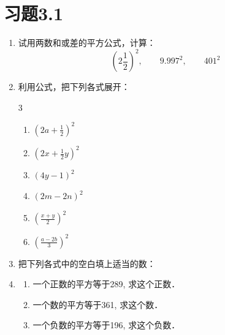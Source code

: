 \section*{习题3.1}
\begin{enumerate}
    \item 试用两数和或差的平方公式，计算：
\[\left(2\frac{1}{2}\right)^2,\qquad 9.997^2,\qquad 401^2\]
    \item 利用公式，把下列各式展开：
\begin{multicols}{3}
\begin{enumerate}
    \item $\left(2a+\frac{1}{2}\right)^2$
    \item $\left(2x+\frac{1}{2}y\right)^2$
    \item $(4y-1)^2$
    \item $(2m-2n)^2$
    \item $\left(\frac{x+y}{2}\right)^2$
    \item $\left(\frac{a-2b}{3}\right)^2$
\end{enumerate}
\end{multicols}
    \item 把下列各式中的空白填上适当的数：
\begin{enumerate}
\end{enumerate}
    \item \begin{enumerate}
        \item 一个正数的平方等于289, 求这个正数．
        \item 一个数的平方等于361, 求这个数．
        \item 一个负数的平方等于196, 求这个负数．
    \end{enumerate}
    

\end{enumerate}
